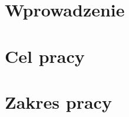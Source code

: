 \section*{Wprowadzenie}

\lipsum[1]

\section*{Cel pracy}

\lipsum[1]

\section*{Zakres pracy}

\lipsum[1]
